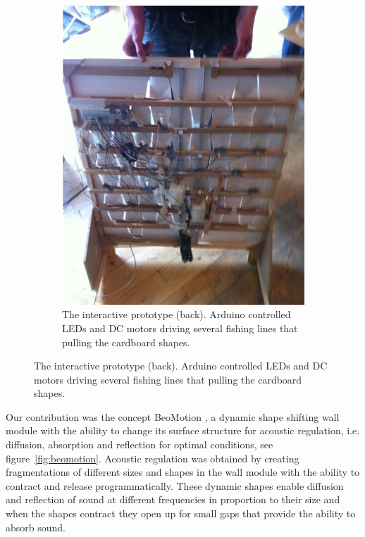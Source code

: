 \begin{figure}[h]
\begin{subfigure}{.44\textwidth}
		\includegraphics[width=\linewidth]{figures/beomotion/prototype_back}
		\caption{The interactive prototype (back). Arduino controlled LEDs and DC motors driving several fishing lines that pulling the cardboard shapes.}
		\label{fig:beomotion:proto_back}
	\end{subfigure}
\end{figure}

Our contribution was the concept BeoMotion \cite{beomotionreportstefan, beomotionreporttore}, a dynamic shape shifting wall module with the ability to change its surface structure for acoustic regulation, i.e. diffusion, absorption and reflection for optimal conditions, see figure~\ref{fig:beomotion}.
Acoustic regulation was obtained by creating fragmentations of different sizes and shapes in the wall module with the ability to contract and release programmatically.
These dynamic shapes enable diffusion and reflection of sound at different frequencies in proportion to their size and when the shapes contract they open up for small gaps that provide the ability to absorb sound. 

